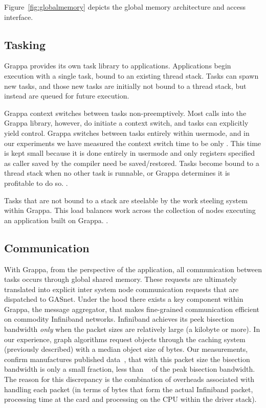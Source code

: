 
Figure~\ref{fig:globalmemory} depicts the global memory architecture and access interface.

\subsection{Tasking}

Grappa provides its own task library to applications.  Applications begin execution with a single task, bound to an existing thread stack.  Tasks can spawn new tasks, and those new tasks are initially not bound to a thread stack, but instead are queued for future execution.

Grappa context switches between tasks non-preemptively.  Most calls into the Grappa library, however, do initiate a context switch, and tasks can explicitly yield control.  Grappa switches between tasks entirely within usermode, and in our experiments we have measured the context switch time to be only .  This time is kept small because it is done entirely in usermode and only registers specified as caller saved by the compiler need be saved/restored.  Tasks become bound to a thread stack when no other task is runnable, or Grappa determines it is profitable to do so.  .

Tasks that are not bound to a stack are steelable by the work steeling system within Grappa.  This load balances work across the collection of nodes executing an application built on Grappa.  .

\subsection{Communication}

With Grappa, from the perspective of the application, all communication between tasks occurs through global shared memory.  These requests are ultimately translated into explicit inter system node communication requests that are dispatched to GASnet.  Under the hood there exists a key component within Grappa, the message aggregator, that makes fine-grained communication efficient on commodity Infiniband networks.  Infiniband achieves its peek bisection bandwidth \emph{only} when the packet sizes are relatively large (a kilobyte or more).  In our experience, graph algorithms request objects through the caching system (previously described) with a median object size of  bytes.  Our measurements, confirm manufactures published data~\cite{infinibandbandwidth}, that with this packet size the bisection bandwidth is only a small fraction, less than ~ of the peak bisection bandwidth.  The reason for this discrepancy is the combination of overheads associated with handling each packet (in terms of bytes that form the actual Infiniband packet, processing time at the card and processing on the CPU within the driver stack).

